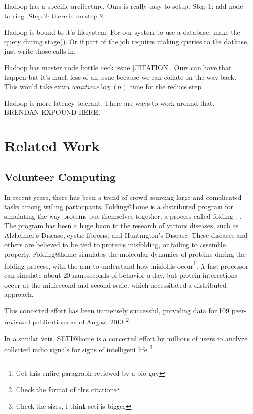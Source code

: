 \documentclass[conference, compsocconf, letterpaper]{IEEEtran}
\begin{document}
Hadoop has a specific arcitecture.  Ours is really easy to setup.  Step 1: add node to ring. Step 2: there is no step 2.

Hadoop is bound to it's filesystem. For our system to use a database, make the query during stage().  Or if part of the job requires making queries to the datbase, just write those calls in.

Hadoop has master node bottle neck issue [CITATION].  Ours can have that happen but it's much less of an issue because we can collate on the way back.   This would take extra  $waittime \log(n)$ time for the reduce step. 

Hadoop is more latency tolerant.  There are ways to work around that.  BRENDAN EXPOUND HERE.


\section{Related Work}

\subsection{Volunteer Computing}
In recent years, there has been a trend of crowd-sourcing large and complicated tasks among willing participants.  Folding@home is a distributed program for simulating the way proteins put themselves together, a process called folding \cite{folding}.  \cite{folding}.  The program has been a huge boon to the research of various diseases, such as Alzheimer's Disease, cystic fibrosis, and Huntington's Disease.  These diseases and others are believed to be tied to proteins misfolding, or failing to assemble properly.  Folding@home simulates the molecular dynamics of proteins during the folding process, with the aim to understand  how misfolds occur\footnote{Get this entire paragraph reviewed by a bio guy}.  A fast processor can simulate about 20 nanoseconds of behavior a day, but protein interactions occur at the millisecond and second scale, which necessitated a distributed approach.  

This concerted effort has been immensely successful, providing data for 109 peer-reviewed publications as of August 2013 \cite{foldingPapers}\footnote{Check the format of this citation}.

In a similar vein, SETI@home is a concerted effort by millions of users to analyze collected radio signals for signs of intelligent life \cite{anderson2002seti}\footnote{Check the sizes, I think seti is bigger}.
\end{document}
